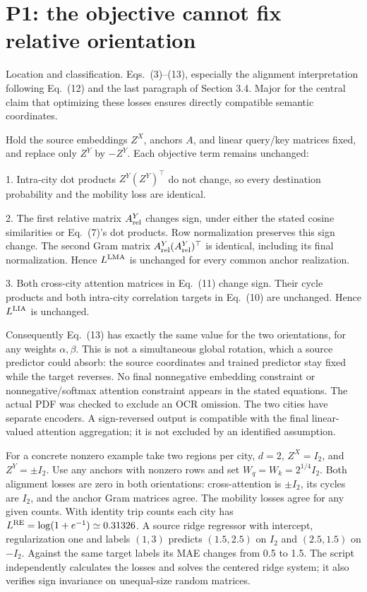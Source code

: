 \documentclass[10pt]{article}
\begin{document}
\section*{P1: the objective cannot fix relative orientation}
Location and classification. Eqs. (3)–(13), especially the alignment interpretation following Eq. (12) and the last paragraph of Section 3.4. Major for the central claim that optimizing these losses ensures directly compatible semantic coordinates.\par
Hold the source embeddings \(Z^X\), anchors \(A\), and linear query/key matrices fixed, and replace only \(Z^Y\) by \(-Z^Y\). Each objective term remains unchanged:\par
1. Intra-city dot products \(Z^Y(Z^Y)^\top\) do not change, so every destination probability and the mobility loss are identical.\par
2. The first relative matrix \(A_{\rm rel}^Y\) changes sign, under either the stated cosine similarities or Eq. (7)’s dot products. Row normalization preserves this sign change. The second Gram matrix \(A_{\rm rel}^Y(A_{\rm rel}^Y)^\top\) is identical, including its final normalization. Hence \(L^{\rm LMA}\) is unchanged for every common anchor realization.\par
3. Both cross-city attention matrices in Eq. (11) change sign. Their cycle products and both intra-city correlation targets in Eq. (10) are unchanged. Hence \(L^{\rm LIA}\) is unchanged.\par
Consequently Eq. (13) has exactly the same value for the two orientations, for any weights \(\alpha,\beta\). This is not a simultaneous global rotation, which a source predictor could absorb: the source coordinates and trained predictor stay fixed while the target reverses. No final nonnegative embedding constraint or nonnegative/softmax attention constraint appears in the stated equations. The actual PDF was checked to exclude an OCR omission. The two cities have separate encoders. A sign-reversed output is compatible with the final linear-valued attention aggregation; it is not excluded by an identified assumption.\par
For a concrete nonzero example take two regions per city, \(d=2\), \(Z^X=I_2\), and \(Z^Y=\pm I_2\). Use any anchors with nonzero rows and set \(W_q=W_k=2^{1/4}I_2\). Both alignment losses are zero in both orientations: cross-attention is \(\pm I_2\), its cycles are \(I_2\), and the anchor Gram matrices agree. The mobility losses agree for any given counts. With identity trip counts each city has \(L^{\rm RE}=\log(1+e^{-1})\simeq0.31326\). A source ridge regressor with intercept, regularization one and labels \((1,3)\) predicts \((1.5,2.5)\) on \(I_2\) and \((2.5,1.5)\) on \(-I_2\). Against the same target labels its MAE changes from 0.5 to 1.5. The script independently calculates the losses and solves the centered ridge system; it also verifies sign invariance on unequal-size random matrices.\par
\end{document}
